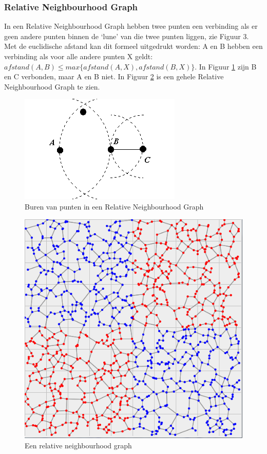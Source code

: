 \documentclass{article}
\begin{document}
\subsubsection{Relative Neighbourhood Graph}
In een Relative Neighbourhood Graph hebben twee punten een verbinding als er geen andere punten binnen de `lune' van die twee punten liggen, zie Figuur 3. Met de euclidische afstand kan dit formeel uitgedrukt worden: A en B hebben een verbinding als voor alle andere punten X geldt: $afstand(A,B) \leq max\{afstand(A,X),afstand(B,X)\}$. In Figuur \ref{RNGburen} zijn B en C  verbonden, maar A en B niet. In Figuur \ref{graaf_xor_RNG} is een gehele Relative Neighbourhood Graph te zien.\\

\begin{figure}[!h]
    \centering
        \includegraphics[scale=1, page=1]{RNGburen}
    \caption{Buren van punten in een Relative Neighbourhood Graph}
    \label{RNGburen}
\end{figure}
\begin{figure}[!h]
    \centering
        \includegraphics[scale=0.5, page=1]{graaf_xor_RNG}
    \caption{Een relative neighbourhood graph}
    \label{graaf_xor_RNG}
\end{figure}
\clearpage
\end{document}
